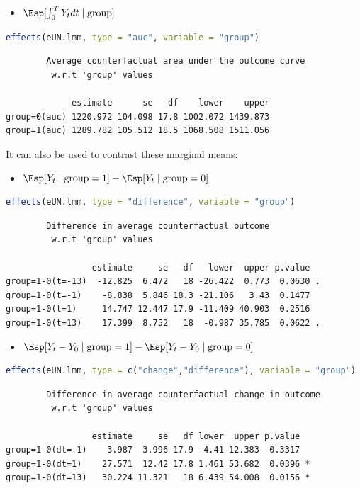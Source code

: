 \documentclass[12pt]{article}
\begin{document}
\begin{itemize}
\item \(\Esp[\int_0^T Y_t dt \mid \text{group}]\)
\end{itemize}
\begin{lstlisting}[language=r,numbers=none]
effects(eUN.lmm, type = "auc", variable = "group")
\end{lstlisting}

\label{}
\begin{verbatim}
		Average counterfactual area under the outcome curve
		 w.r.t 'group' values 

             estimate      se   df    lower    upper
group=0(auc) 1220.972 104.098 17.8 1002.072 1439.873
group=1(auc) 1289.782 105.512 18.5 1068.508 1511.056
\end{verbatim}


It can also be used to contrast these marginal means:
\begin{itemize}
\item \(\Esp[Y_t \mid \text{group}=1]-\Esp[Y_t \mid \text{group}=0]\)
\end{itemize}
\begin{lstlisting}[language=r,numbers=none]
effects(eUN.lmm, type = "difference", variable = "group")
\end{lstlisting}

\label{}
\begin{verbatim}
		Difference in average counterfactual outcome
		 w.r.t 'group' values 

                 estimate     se   df   lower  upper p.value  
group=1-0(t=-13)  -12.825  6.472   18 -26.422  0.773  0.0630 .
group=1-0(t=-1)    -8.838  5.846 18.3 -21.106   3.43  0.1477  
group=1-0(t=1)     14.747 12.447 17.9 -11.409 40.903  0.2516  
group=1-0(t=13)    17.399  8.752   18  -0.987 35.785  0.0622 .
\end{verbatim}


\begin{itemize}
\item \(\Esp[Y_t-Y_0 \mid \text{group}=1]-\Esp[Y_t-Y_0 \mid \text{group}=0]\)
\end{itemize}
\begin{lstlisting}[language=r,numbers=none]
effects(eUN.lmm, type = c("change","difference"), variable = "group")
\end{lstlisting}

\label{}
\begin{verbatim}
		Difference in average counterfactual change in outcome
		 w.r.t 'group' values 

                 estimate     se   df lower  upper p.value  
group=1-0(dt=-1)    3.987  3.996 17.9 -4.41 12.383  0.3317  
group=1-0(dt=1)    27.571  12.42 17.8 1.461 53.682  0.0396 *
group=1-0(dt=13)   30.224 11.321   18 6.439 54.008  0.0156 *
\end{verbatim}
\end{document}
